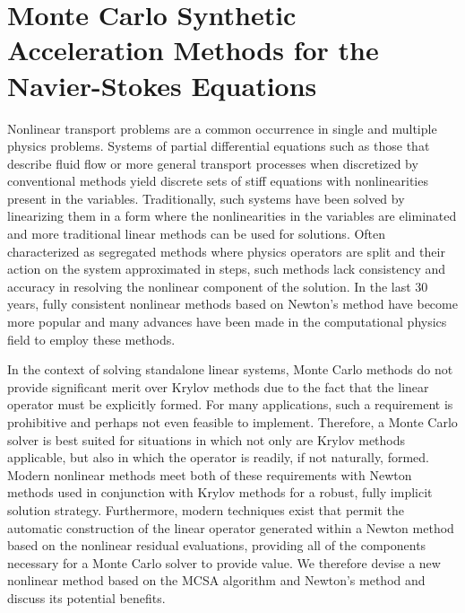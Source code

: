 \chapter{Monte Carlo Synthetic Acceleration Methods for the Navier-Stokes Equations}
\label{ch:nonlinear_problem}
Nonlinear transport problems are a common occurrence in single and
multiple physics problems. Systems of partial differential equations
such as those that describe fluid flow or more general transport
processes when discretized by conventional methods yield discrete sets
of stiff equations with nonlinearities present in the
variables. Traditionally, such systems have been solved by linearizing
them in a form where the nonlinearities in the variables are
eliminated and more traditional linear methods can be used for
solutions. Often characterized as segregated methods where physics
operators are split and their action on the system approximated in
steps, such methods lack consistency and accuracy in resolving the
nonlinear component of the solution. In the last 30 years, fully
consistent nonlinear methods based on Newton's method have become more
popular and many advances have been made in the computational physics
field to employ these methods.

In the context of solving standalone linear systems, Monte Carlo
methods do not provide significant merit over Krylov methods due to
the fact that the linear operator must be explicitly formed. For many
applications, such a requirement is prohibitive and perhaps not even
feasible to implement. Therefore, a Monte Carlo solver is best suited
for situations in which not only are Krylov methods applicable, but
also in which the operator is readily, if not naturally,
formed. Modern nonlinear methods meet both of these requirements with
Newton methods used in conjunction with Krylov methods for a robust,
fully implicit solution strategy. Furthermore, modern techniques exist
that permit the automatic construction of the linear operator
generated within a Newton method based on the nonlinear residual
evaluations, providing all of the components necessary for a Monte
Carlo solver to provide value. We therefore devise a new nonlinear
method based on the MCSA algorithm and Newton's method and discuss its
potential benefits.

